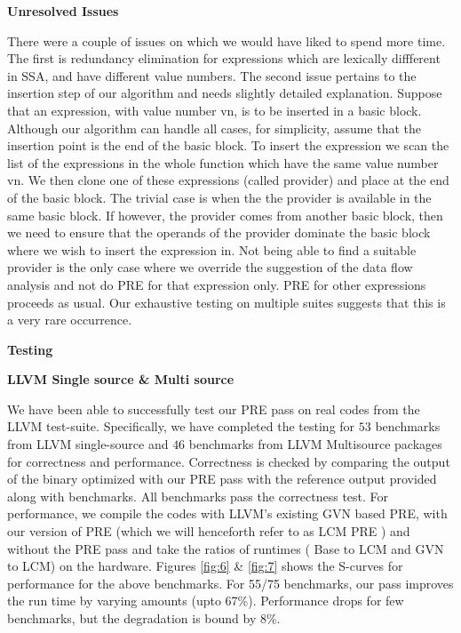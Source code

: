 \documentclass[10pt,twoside]{report}
\begin{document}
\begin{flushleft}
\textbf{\large{Unresolved Issues}}
\end{flushleft}
There were a couple of issues on which we would have liked to spend more time. The first is redundancy 
elimination for expressions which are lexically diffferent in SSA, and have different value numbers. The 
second issue pertains to the insertion step of our algorithm and needs slightly detailed explanation.
Suppose that an expression, with value number vn, is to be inserted in a basic block.
Although our algorithm can handle all cases, for simplicity, assume that the
insertion point is the end of the basic block. To insert the expression we
scan the list of the expressions in the whole function which have the same
value number vn.  We then clone one of these expressions (called provider)
  and place at the end of the basic block. The trivial case is when the the
  provider is available in the same basic block. If however, the provider
  comes from another basic block, then we need to ensure that the operands
  of the provider dominate the basic block where we wish to insert the
  expression in. Not being able to find a suitable provider is the only case
  where we override the suggestion of the data flow analysis and not do PRE
  for that expression only. PRE for other expressions proceeds as usual. Our
  exhaustive testing on multiple suites suggests that this is a very rare occurrence. 

\newpage  
\begin{flushleft}
\textbf{\Large{Testing}}
\end{flushleft}

\begin{flushleft}
\textbf{\normalsize{LLVM Single source \& Multi source}}
\end{flushleft}
We have been able to successfully test our PRE pass on real codes from the LLVM
test-suite.  Specifically, we have completed the testing for $53$ benchmarks
from LLVM single-source and $46$ benchmarks from LLVM Multisource packages for
correctness and performance. Correctness is checked by comparing the output of
the binary optimized with our PRE pass with the reference output provided along
with benchmarks. All benchmarks pass the correctness test. For performance, we
compile the codes with LLVM's existing GVN based PRE, with our version of PRE
(which we will henceforth refer to as LCM PRE ) and without the PRE pass and
take the ratios of runtimes ( Base to LCM and GVN to LCM) on the hardware.
Figures \ref{fig:6} \& \ref{fig:7} shows the S-curves for performance for the above
benchmarks.  For 55/75 benchmarks, our pass improves the run time by varying
amounts (upto 67\%). Performance drops for few benchmarks, but the degradation
is bound by 8\%.
\end{document}
